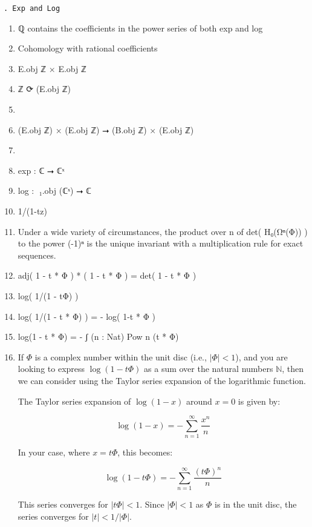 \documentclass{book}
\newcounter{pcounter}
\newcounter{sectioncount}
\newcounter{subsectioncount}
\renewcommand{\subsection}[1]{\texttt{\thesubsectioncount . #1} \stepcounter{subsectioncount}}
\begin{document}
\subsection{Exp and Log}

\begin{enumerate}
\item ℚ contains the coefficients in the power series of both exp and log
\item Cohomology with rational coefficients
\item E.obj ℤ × E.obj ℤ
\item ℤ ⟳ (E.obj ℤ)
\item 
\item (E.obj ℤ) × (E.obj ℤ) ⭢ (B.obj ℤ) × (E.obj ℤ)
\item 
\item exp : ℂ ⭢ ℂˣ
\item log : π⃡₁.obj (ℂˣ) ⭢ ℂ
\item 1/(1-tz)
\item Under a wide variety of circumstances, the product over n of det( H₀(Ωⁿ(Φ)) ) to the power (-1)ⁿ is the unique invariant with a multiplication rule for exact sequences.
\item adj( 1 - t * Φ ) * ( 1 - t * Φ ) = det( 1 - t * Φ )
\item log( 1/(1 - tΦ) )
\item log( 1/(1 - t * Φ) ) = - log( 1-t * Φ ) 
\item log(1 - t * Φ) = - ʃ (n : Nat)  Pow n (t * Φ)
\item \iffalse If \(\Phi\) is a complex number within the unit disc (i.e., \(|\Phi| < 1\)), and you are looking to express \(\log(1 - t\Phi)\) as a sum over the natural numbers \(ℕ\), then we can consider using the Taylor series expansion of the logarithmic function.

The Taylor series expansion of \(\log(1 - x)\) around \(x = 0\) is given by:

\[
\log(1 - x) = -\sum_{n=1}^{\infty} \frac{x^n}{n}
\]

In your case, where \(x = t\Phi\), this becomes:

\[
\log(1 - t\Phi) = -\sum_{n=1}^{\infty} \frac{(t\Phi)^n}{n}
\]

This series converges for \(|t\Phi| < 1\). Since \(|\Phi| < 1\) as \(\Phi\) is in the unit disc, the series converges for \(|t| < 1/|\Phi|\).\\


\end{enumerate}
\end{document}
